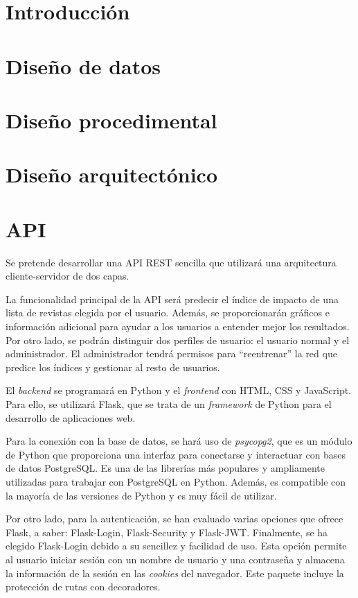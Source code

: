 
\section{Introducción}

\section{Diseño de datos}

\section{Diseño procedimental}

\section{Diseño arquitectónico}


\section{API}

Se pretende desarrollar una API REST sencilla que utilizará una arquitectura cliente-servidor de dos capas.

La funcionalidad principal de la API será predecir el índice de impacto de una lista de revistas elegida por el usuario. Además, se proporcionarán gráficos e información adicional para ayudar a los usuarios a entender mejor los resultados. Por otro lado, se podrán distinguir dos perfiles de usuario: el usuario normal y el administrador. El administrador tendrá permisos para ``reentrenar'' la red que predice los índices y gestionar al resto de usuarios.

El \textit{backend} se programará en Python y el \textit{frontend} con HTML, CSS y JavaScript. Para ello, se utilizará Flask, que se trata de un \textit{framework} de Python para el desarrollo de aplicaciones web.

Para la conexión con la base de datos, se hará uso de \textit{psycopg2}, que es un módulo de Python que proporciona una interfaz para conectarse y interactuar con bases de datos PostgreSQL. 
Es una de las librerías más populares y ampliamente utilizadas para trabajar con PostgreSQL en Python. Además, es compatible con la mayoría de las versiones de Python y es muy fácil de utilizar.

Por otro lado, para la autenticación, se han evaluado varias opciones que ofrece Flask, a saber: Flask-Login, Flask-Security y Flask-JWT. 
Finalmente, se ha elegido Flask-Login debido a su sencillez y facilidad de uso. Esta opción permite al usuario iniciar sesión con un nombre de usuario y una contraseña y almacena la información de la sesión en las \textit{cookies} del navegador. Este paquete incluye la protección de rutas con decoradores.

